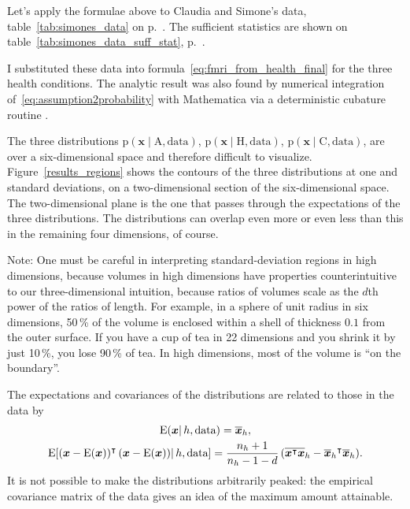 \documentclass[\ifafour a4paper,12pt,\else a5paper,10pt,\fi%
onecolumn,oneside,article,%
british%
]{memoir}
\theoremstyle{remark}
\theoremstyle{innote}
\newcommand*{\citep}{\parencites}
\DeclarePairedDelimiter\clcl{[}{]}
\newcommand*{\pf}{\mathrm{p}}%
\renewcommand*{\|}{\mathpunct{|}}
\newcommand*{\T}{^\intercal}%
\newcommand*{\E}{\mathrm{E}}
\DeclarePairedDelimiter\expp{(}{)}
\newcommand*{\expe}{\E\expp}%
\newcommand*{\expeb}{\E\clcl}%
\newcommand*{\yH}{h}
\newcommand*{\yx}{x}
\newcommand*{\yxx}{\bm{\yx}}
\newcommand*{\data}{\text{data}}
\newcommand*{\ya}{\mathrm{A}}
\newcommand*{\yi}{\mathrm{C}}
\newcommand*{\yh}{\mathrm{H}}
\newcommand*{\yn}{n}
\newcommand*{\yd}{d}
\newcommand*{\yno}{\yn_{\yH}}
\newcommand*{\vxxo}{\overline{\yxx}_{\yH}}
\newcommand*{\vxto}{\overline{\yxx\T\yxx}_{\yH}}
\theoremstyle{plain}
\begin{document}
Let's apply the formulae above to Claudia and Simone's data,
table~\ref{tab:simones_data} on p.~\pageref{tab:simones_data}. The
sufficient statistics are shown on table~\ref{tab:simones_data_suff_stat},
p.~\pageref{tab:simones_data_suff_stat}.



I substituted these data into formula~\eqref{eq:fmri_from_health_final} for
the three health conditions. The analytic result was also found by
numerical integration of~\eqref{eq:assumption2probability} with Mathematica
via a deterministic cubature routine \citep{hahn2005}.

The three distributions
\label{eq:results_discussion}$ \pf(\yxx \| \ya, \data)$,
$ \pf(\yxx \| \yh, \data)$, $ \pf(\yxx \| \yi, \data)$, are over a
six-dimensional space and therefore difficult to visualize.
Figure~\ref{results_regions} shows the contours of the three distributions
at one and standard deviations, on a two-dimensional section of the
six-dimensional space. The two-dimensional plane is the one that passes
through the expectations of the three distributions. The distributions can
overlap even more or even less than this in the remaining four dimensions,
of course.

Note: One must be careful in interpreting standard-deviation regions in high
dimensions, because volumes in high dimensions have properties
counterintuitive to our three-dimensional intuition, because ratios of
volumes scale as the $\yd$th power of the ratios of length. For example, in
a sphere of unit radius in six dimensions, 50\,\% of the volume is enclosed
within a shell of thickness $0.1$ from the outer surface. If you have a cup
of tea in 22 dimensions and you shrink it by just 10\,\%, you lose 90\,\%
of tea. In high dimensions, most of the volume is \enquote{on the
  boundary}.

The expectations and covariances of the distributions are related to those
in the data by
\begin{equation}
  \label{eq:moments_tstudent}
  \begin{gathered}
    \expe{\yxx \|\yH,\data} = \vxxo,\\
    \expeb{(\yxx-\expe{\yxx})\T\,(\yxx-\expe{\yxx}) \|\yH,\data}
    =\frac{\yno+1}{\yno-1-\yd}\,(\vxto-{\vxxo}\T\vxxo).
  \end{gathered}
\end{equation}
It is not possible to make the distributions arbitrarily peaked: the
empirical covariance matrix of the data gives an idea of the maximum
amount attainable.
\end{document}
